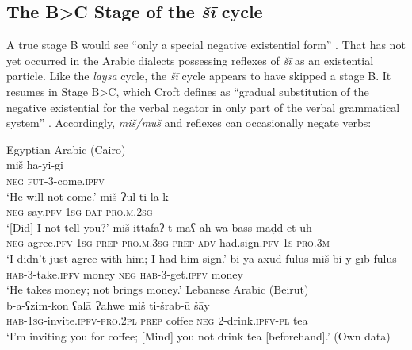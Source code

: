\documentclass[output=paper,colorlinks,citecolor=brown]{langscibook}
\begin{document}
\subsection{The B>C Stage of the \textit{šī} cycle} \label{s:WiAR-3.4}

A true stage B would see “only a special negative existential form” \citep[9]{Croft1991}. That has not yet occurred in the Arabic dialects possessing reflexes of \textit{šī} as an existential particle. Like the \textit{laysa} cycle, the \textit{šī} cycle appears to have skipped a stage B. It resumes in Stage B>C, which Croft defines as “gradual substitution of the negative existential for the verbal negator in only part of the verbal grammatical system” \citeyearpar[10]{Croft1991}. Accordingly, \textit{miš/muš} and reflexes can occasionally negate verbs:

\ea Egyptian Arabic (Cairo) \label{ex:WiAR-18}\\
  \ea
  	\gll miš ħa-yi-gi\\
  	\textsc{neg} \textsc{fut-3}-come.\textsc{ipfv}\\
  	\glt ‘He will not come.’ \citep[87]{doss2008a}
  \ex
  	\gll miš Ɂul-ti la-k\\
  	\textsc{neg} say.\textsc{pfv-1sg} \textsc{dat-pro.m.2sg}\\
    \glt ‘[Did] I not tell you?’ \citep[87]{doss2008a}
  \ex
  	\gll miš ittafaʔ-t maʕ-āh wa-bass maḍḍ-ēt-uh\\
  	\textsc{neg} agree.\textsc{pfv-1sg} \textsc{prep-pro.m.3sg} \textsc{prep-adv} had.sign.\textsc{pfv-1s-pro.3m}\\
    \glt ‘I didn’t just agree with him; I had him sign.’ \citep[86]{doss2008a}
  \ex
  	\gll bi-ya-axud fulūs miš bi-y-gīb fulūs\\
  	\textsc{hab-3}-take.\textsc{ipfv} money \textsc{neg} \textsc{hab-3}-get.\textsc{ipfv} money\\
    \glt ‘He takes money; not brings money.’ \citep[248]{al-sayyed2017a}
\newpage
  \ex Lebanese Arabic (Beirut)\\
  	\gll b-a-ʕzim-kon ʕalā Ɂahwe miš ti-šrab-ū šāy\\
  	\textsc{hab-1sg}-invite.\textsc{ipfv-pro.2pl} \textsc{prep} coffee \textsc{neg} 2-drink.\textsc{ipfv-pl} tea\\
  	\glt ‘I’m inviting you for coffee; [Mind] you not drink tea [beforehand].’ (Own data)
\z \z
\end{document}
